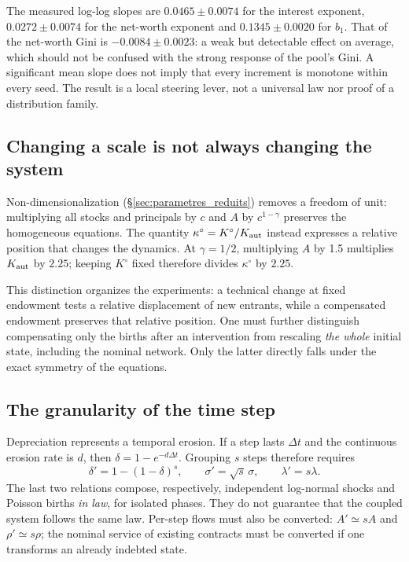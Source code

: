
The measured log-log slopes are $0.0465\pm0.0074$ for the interest
exponent, $0.0272\pm0.0074$ for the net-worth exponent and
$0.1345\pm0.0020$ for $b_1$. That of the net-worth Gini is
$-0.0084\pm0.0023$: a weak but detectable effect on average, which
should not be confused with the strong response of the pool's Gini. A
significant mean slope does not imply that every increment is monotone
within every seed. The result is a local steering lever, not a
universal law nor proof of a distribution family.

\subsection{Changing a scale is not always changing the system}
Non-dimensionalization (\S\ref{sec:parametres_reduits}) removes a
freedom of unit: multiplying all stocks and principals by $c$ and $A$
by $c^{1-\gamma}$ preserves the homogeneous equations. The quantity
$\kappa^\circ=K^\circ/K_{\rm aut}$ instead expresses a relative position
that changes the dynamics. At $\gamma=1/2$, multiplying $A$ by 1.5
multiplies $K_{\rm aut}$ by $2.25$; keeping $K^\circ$ fixed therefore
divides $\kappa^\circ$ by $2.25$.

This distinction organizes the experiments: a technical change at fixed
endowment tests a relative displacement of new entrants, while a
compensated endowment preserves that relative position. One must
further distinguish compensating only the births after an intervention
from rescaling \emph{the whole} initial state, including the nominal
network. Only the latter directly falls under the exact symmetry of
the equations.

\subsection{The granularity of the time step}\label{sec:temps}
Depreciation represents a temporal erosion. If a step lasts $\Delta t$
and the continuous erosion rate is $d$, then $\delta=1-e^{-d\Delta t}$.
Grouping $s$ steps therefore requires
\[
 \delta'=1-(1-\delta)^s,\qquad
 \sigma'=\sqrt{s}\,\sigma,\qquad \lambda'=s\lambda.
\]
The last two relations compose, respectively, independent log-normal
shocks and Poisson births \emph{in law}, for isolated phases. They do
not guarantee that the coupled system follows the same law. Per-step
flows must also be converted: $A'\simeq sA$ and $\rho'\simeq s\rho$; the
nominal service of existing contracts must be converted if one
transforms an already indebted state.

